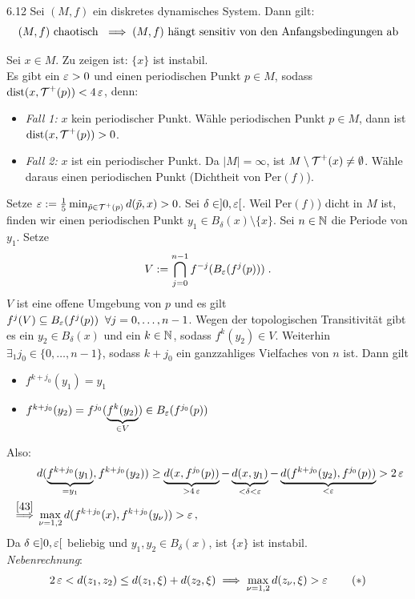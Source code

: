 \documentclass[a4paper]{article}
\begin{document}
\begin{Satz}{}{6.12}
Sei $(M,f)$ ein diskretes dynamisches System. Dann gilt:
\[(M,f)\text{ chaotisch }\implies (M,f)\text{ hängt sensitiv von den Anfangsbedingungen ab}\]
\end{Satz}
\begin{Beweis}
Sei $x\in M$. Zu zeigen ist: $\{x\}$ ist instabil.
\\Es gibt ein $\operatorname{\varepsilon}>0$ und einen periodischen Punkt $p\in M$, sodass $\operatorname{\mathrm{dist}}(x,\operatorname{\mathcal{T}}^+(p))<4\operatorname{\varepsilon}$, denn:
\begin{itemize}
\item\textit{Fall 1:} $x$ kein periodischer Punkt. Wähle periodischen Punkt $p\in M$, dann ist $\operatorname{\mathrm{dist}}(x,\operatorname{\mathcal{T}}^+(p))>0$.
\item \textit{Fall 2:} $x$ ist ein periodischer Punkt. Da $|M|=\infty$, ist $M\setminus\operatorname{\mathcal{T}}^+(x)\ne\emptyset$. Wähle daraus einen periodischen Punkt (Dichtheit von $\mathrm{Per}(f)$).
\end{itemize}
Setze $\operatorname{\varepsilon}:=\frac{1}{5}\min_{\tilde{p}\in\operatorname{\mathcal{T}}^+(p)}d(\tilde{p},x)>0$. Sei $\delta\in]0,\operatorname{\varepsilon}[$. Weil $\mathrm{Per}(f)$) dicht in $M$ ist, finden wir einen periodischen Punkt $y_1\in B_{\delta}(x)\setminus\{x\}$. Sei $n\in\operatorname{\mathbb N}$ die Periode von $y_1$. Setze
\[V:=\bigcap_{j=0}^{n-1}f^{-j}(B_{\operatorname{\varepsilon}}(f^j(p)))\;.\]
$V$ ist eine offene Umgebung von $p$ und es gilt $f^j(V)\subseteq B_{\operatorname{\varepsilon}}(f^j(p))\;\;\forall j=0,\ldots,n-1$. Wegen der topologischen Transitivität gibt es ein $y_2\in B_{\delta}(x)$ und ein $k\in\operatorname{\mathbb N}$, sodass $f^k(y_2)\in V$. Weiterhin $\exists_1j_0\in\{0,\ldots,n-1\}$, sodass $k+j_0$ ein ganzzahliges Vielfaches von $n$ ist. Dann gilt
\begin{itemize}
\item $f^{k+j_0}(y_1)=y_1$
\item $f^{k+j_0}(y_2)=f^{j_0}(\underbrace{f^k(y_2)}_{\in V})\in B_{\operatorname{\varepsilon}}(f^{j_0}(p))$
\end{itemize}
Also:
\begin{align*}
&d(\underbrace{f^{k+j_0}(y_1)}_{=y_1},f^{k+j_0}(y_2))\ge \underbrace{d(x,f^{j_0}(p))}_{>4\operatorname{\varepsilon}}-\underbrace{d(x,y_1)}_{<\delta<\operatorname{\varepsilon}}-\underbrace{d(f^{k+j_0}(y_2),f^{j_0}(p))}_{<\operatorname{\varepsilon}}>2\operatorname{\varepsilon}\\
\overset{\eqref{43}}{\implies} &\max_{\nu=1,2}d(f^{k+j_0}(x),f^{k+j_0}(y_{\nu}))>\operatorname{\varepsilon}\,,
\end{align*}
Da $\delta\in]0,\operatorname{\varepsilon}[$ beliebig und $y_1,y_2\in B_{\delta}(x)$, ist $\{x\}$ ist instabil.\\
\textit{Nebenrechnung}:
\[2\operatorname{\varepsilon}<d(z_1,z_2)\le d(z_1,\xi)+d(z_2,\xi)\implies \max_{\nu=1,2}d(z_{\nu},\xi)>\operatorname{\varepsilon}\tag{$*$}\label{43}\]

\end{Beweis}
\end{document}
